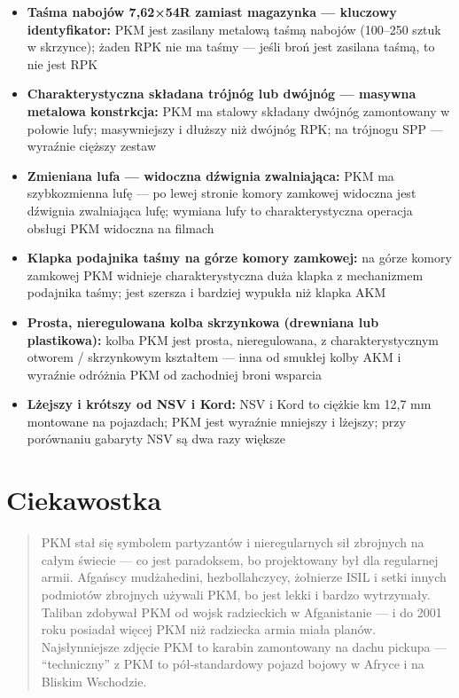 \documentclass[12pt,openany,oneside]{book}
\providecommand{\tightlist}{%
  \setlength{\itemsep}{0pt}\setlength{\parskip}{0pt}}
\begin{document}
\begin{itemize}
\tightlist
\item
  \textbf{Taśma nabojów 7,62×54R zamiast magazynka --- kluczowy
  identyfikator:} PKM jest zasilany metalową taśmą nabojów (100--250
  sztuk w skrzynce); żaden RPK nie ma taśmy --- jeśli broń jest zasilana
  taśmą, to nie jest RPK
\item
  \textbf{Charakterystyczna składana trójnóg lub dwójnóg --- masywna
  metalowa konstrkcja:} PKM ma stalowy składany dwójnóg zamontowany w
  połowie lufy; masywniejszy i dłuższy niż dwójnóg RPK; na trójnogu SPP
  --- wyraźnie cięższy zestaw
\item
  \textbf{Zmieniana lufa --- widoczna dźwignia zwalniająca:} PKM ma
  szybkozmienna lufę --- po lewej stronie komory zamkowej widoczna jest
  dźwignia zwalniająca lufę; wymiana lufy to charakterystyczna operacja
  obsługi PKM widoczna na filmach
\item
  \textbf{Klapka podajnika taśmy na górze komory zamkowej:} na górze
  komory zamkowej PKM widnieje charakterystyczna duża klapka z
  mechanizmem podajnika taśmy; jest szersza i bardziej wypukła niż
  klapka AKM
\item
  \textbf{Prosta, nieregulowana kolba skrzynkowa (drewniana lub
  plastikowa):} kolba PKM jest prosta, nieregulowana, z
  charakterystycznym otworem / skrzynkowym kształtem --- inna od smukłej
  kolby AKM i wyraźnie odróżnia PKM od zachodniej broni wsparcia
\item
  \textbf{Lżejszy i krótszy od NSV i Kord:} NSV i Kord to ciężkie km
  12,7 mm montowane na pojazdach; PKM jest wyraźnie mniejszy i lżejszy;
  przy porównaniu gabaryty NSV są dwa razy większe
\end{itemize}

\section{Ciekawostka}\label{ciekawostka-56}

\begin{quote}
PKM stał się symbolem partyzantów i nieregularnych sił zbrojnych na
całym świecie --- co jest paradoksem, bo projektowany był dla regularnej
armii. Afgańscy mudżahedini, hezbollahczycy, żołnierze ISIL i setki
innych podmiotów zbrojnych używali PKM, bo jest lekki i bardzo
wytrzymały. Taliban zdobywał PKM od wojsk radzieckich w Afganistanie ---
i do 2001 roku posiadał więcej PKM niż radziecka armia miała planów.
Najsłynniejsze zdjęcie PKM to karabin zamontowany na dachu pickupa ---
``techniczny'' z PKM to pół-standardowy pojazd bojowy w Afryce i na
Bliskim Wschodzie.
\end{quote}
\end{document}

